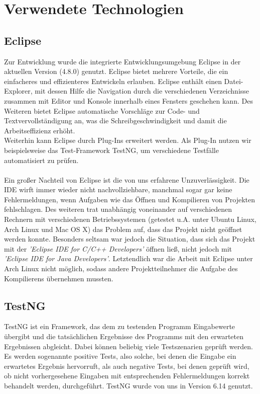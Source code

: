 
\section{Verwendete Technologien}

\subsection{Eclipse}
Zur Entwicklung wurde die integrierte Entwicklungsumgebung Eclipse in der aktuellen Version (4.8.0) genutzt. 
Eclipse bietet mehrere Vorteile, die ein einfacheres und effizienteres Entwickeln erlauben. Eclipse enthält einen Datei-Explorer, mit dessen Hilfe die Navigation durch die verschiedenen Verzeichnisse zusammen mit Editor und Konsole innerhalb eines Fensters geschehen kann. Des Weiteren bietet Eclipse automatische Vorschläge zur Code- und Textvervollständigung an, was die Schreibgeschwindigkeit und damit die Arbeitseffizienz erhöht. 
\\
Weiterhin kann Eclipse durch Plug-Ins erweitert werden. Als Plug-In nutzen wir beispielsweise das Test-Framework TestNG, um verschiedene Testfälle automatisiert zu prüfen.
\\\\
Ein großer Nachteil von Eclipse ist die von uns erfahrene Unzuverlässigkeit. Die IDE wirft immer wieder nicht nachvollziehbare, manchmal sogar gar keine Fehlermeldungen, wenn Aufgaben wie das Öffnen und Kompilieren von Projekten fehlschlagen. Des weiteren trat unabhängig voneinander auf verschiedenen Rechnern mit verschiedenen Betriebssystemen (getestet u.A. unter Ubuntu Linux, Arch Linux und Mac OS X) das Problem auf, dass das Projekt nicht geöffnet werden konnte. Besonders seltsam war jedoch die Situation, dass sich das Projekt mit der \textit{'Eclipse IDE for C/C++ Developers'} öffnen ließ, nicht jedoch mit \textit{'Eclipse IDE for Java Developers'}. Letztendlich war die Arbeit mit Eclipse unter Arch Linux nicht möglich, sodass andere Projektteilnehmer die Aufgabe des Kompilierens übernehmen mussten.

\subsection{TestNG}
TestNG ist ein Framework, das dem zu testenden Programm Eingabewerte übergibt und die tatsächlichen Ergebnisse des Programms mit den erwarteten Ergebnissen abgleicht. Dabei können beliebig viele Testszenarien geprüft werden. Es werden sogenannte positive Tests, also solche, bei denen die Eingabe ein erwartetes Ergebnis hervorruft, als auch negative Tests, bei denen geprüft wird, ob nicht vorhergesehene Eingaben mit entsprechenden Fehlermeldungen korrekt behandelt werden, durchgeführt. TestNG wurde von uns in Version 6.14 genutzt.

